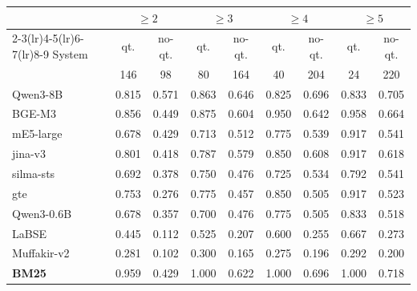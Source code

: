 \begin{tabular}{lcccccccc}
\toprule
& \multicolumn{2}{c}{$\geq2$} & \multicolumn{2}{c}{$\geq3$} & \multicolumn{2}{c}{$\geq4$} & \multicolumn{2}{c}{$\geq5$} \\
\cmidrule(lr){2-3}\cmidrule(lr){4-5}\cmidrule(lr){6-7}\cmidrule(lr){8-9}
System & qt. & no-qt. & qt. & no-qt. & qt. & no-qt. & qt. & no-qt. \\
& \scriptsize 146 & \scriptsize 98 & \scriptsize 80 & \scriptsize 164 & \scriptsize 40 & \scriptsize 204 & \scriptsize 24 & \scriptsize 220 \\
\midrule
Qwen3-8B & 0.815 & 0.571 & 0.863 & 0.646 & 0.825 & 0.696 & 0.833 & 0.705 \\
BGE-M3 & 0.856 & 0.449 & 0.875 & 0.604 & 0.950 & 0.642 & 0.958 & 0.664 \\
mE5-large & 0.678 & 0.429 & 0.713 & 0.512 & 0.775 & 0.539 & 0.917 & 0.541 \\
jina-v3 & 0.801 & 0.418 & 0.787 & 0.579 & 0.850 & 0.608 & 0.917 & 0.618 \\
silma-sts & 0.692 & 0.378 & 0.750 & 0.476 & 0.725 & 0.534 & 0.792 & 0.541 \\
gte & 0.753 & 0.276 & 0.775 & 0.457 & 0.850 & 0.505 & 0.917 & 0.523 \\
Qwen3-0.6B & 0.678 & 0.357 & 0.700 & 0.476 & 0.775 & 0.505 & 0.833 & 0.518 \\
LaBSE & 0.445 & 0.112 & 0.525 & 0.207 & 0.600 & 0.255 & 0.667 & 0.273 \\
Muffakir-v2 & 0.281 & 0.102 & 0.300 & 0.165 & 0.275 & 0.196 & 0.292 & 0.200 \\
\midrule
\textbf{BM25} & 0.959 & 0.429 & 1.000 & 0.622 & 1.000 & 0.696 & 1.000 & 0.718 \\
\bottomrule
\end{tabular}
